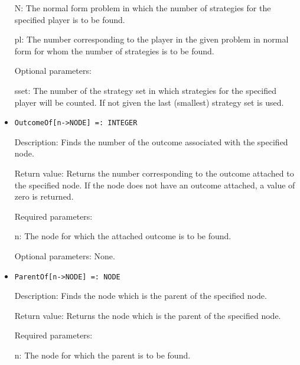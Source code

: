 \begin{itemize}
\bd
\item
[ N:] The normal form problem in which the number of strategies for
the specified player is to be found.
\item
[ pl:] The number corresponding to the player in the given problem 
in normal form for whom the number of strategies is to be
found.
\ed

\item
[Optional parameters:]\hfil\null
	
\bd
\item  
[ sset:] The number of the strategy set in which strategies for the
specified player will be counted.  If not given the last (smallest) 
strategy set is used.

\ed
\ed

\item

\protect \large \begin{verbatim}
OutcomeOf[n->NODE] =: INTEGER
\end{verbatim}\normalsize

\bd

\item
[Description:] Finds the number of the outcome associated with the 
specified node.
\item
[Return value:] Returns the number corresponding to the outcome attached
to the specified node.  If the node does not have an outcome attached,
a value of zero is returned.
\item
[Required parameters:]\hfil\null
	
\bd
\item
[ n:] The node for which the attached outcome is to be found.
\ed

\item
[Optional parameters:] None.
\ed

\item

\protect \large \begin{verbatim}
ParentOf[n->NODE] =: NODE
\end{verbatim}\normalsize

\bd
\item
[Description:] Finds the node which is the parent of the specified node.
\item
[Return value:] Returns the node which is the parent of the specified
node.
\item
[Required parameters:]\hfil\null
	
\bd
\item
[ n:] The node for which the parent is to be found.
\ed


\end{itemize}
